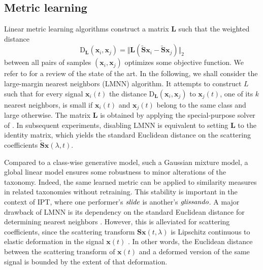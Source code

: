 \subsection{Metric learning} %
Linear metric learning algorithms construct a matrix $\mathbf{L}$ such that the weighted distance
\begin{equation}
\mathrm{D}_\mathbf{L}(\boldsymbol{x}_i, \boldsymbol{x}_j) = \Vert \mathbf{L} (\widetilde{\mathbf{S}}\boldsymbol{x}_i-\widetilde{\mathbf{S}}\boldsymbol{x}_j) \Vert_2
\end{equation}
between all pairs of samples $(\boldsymbol{x}_i, \boldsymbol{x}_j)$ optimizes some objective function.
We refer to \cite{bellet2013survey} for a review of the state of the art.
In the following, we shall consider the large-margin nearest neighbors (LMNN) algorithm.
It attempts to construct $L$ such that for every signal $\boldsymbol{x}_i (t)$ the distance $\mathrm{D}_\mathbf{L}(\boldsymbol{x}_i, \boldsymbol{x}_j)$ to $\boldsymbol{x}_j (t)$, one of its $k$ nearest neighbors, is small if $\boldsymbol{x}_i (t)$ and $\boldsymbol{x}_j (t)$ belong to the same class and large otherwise.
The matrix $\mathbf{L}$ is obtained by applying the special-purpose solver of \cite[appendix A]{weinberger2009jmlr}.
In subsequent experiments, disabling LMNN is equivalent to setting $\mathbf{L}$ to the identity matrix, which yields the standard Euclidean distance on the scattering coefficients $\widetilde{\mathbf{S}} \boldsymbol{x} (\lambda, t)$.

Compared to a class-wise generative model, such a Gaussian mixture model, a global linear model ensures some robustness to minor alterations of the taxonomy.
Indeed, the same learned metric can be applied to similarity measures in related taxonomies without retraining.
This stability is important in the context of IPT, where one performer's $\emph{slide}$ is another's $\emph{glissando}$.
A major drawback of LMNN is its dependency on the standard Euclidean distance for determining nearest neighbors \cite{mcfee2010icml}.
However, this is alleviated for scattering coefficients, since the scattering transform $\mathbf{S} \boldsymbol{x} (t, \lambda)$ is Lipschitz continuous to elastic deformation in the signal $\boldsymbol{x} (t)$ \cite[Theorem 2.16]{mallat2012cpam}.
In other words, the Euclidean distance between the scattering transform of $\boldsymbol{x} (t)$ and a deformed version of the same signal is bounded by the extent of that deformation.



